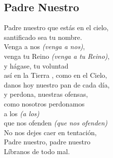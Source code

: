 

\subsection{Padre Nuestro}

\begin{center}

{\Large
Padre nuestro que estás en el cielo,\\   
santificado sea tu nombre.\\
Venga a nos \textit{(venga a nos)}, \\ 
venga tu Reino \textit{(venga a tu Reino)},\\
\vspace{1em}
y  hágase, tu voluntad\\
así en la Tierra , como en el Cielo,\\
danos hoy nuestro pan de cada día,\\
\vspace{1em}
y perdona, nuestras ofensas,\\
como nosotros perdonamos\\
a los \textit{(a los)}\\
que nos ofenden
\textit{(que nos ofenden)}\\   
\vspace{1em}
No nos dejes caer en tentación,\\
Padre nuestro, padre nuestro\\
Líbranos de todo mal.
}

\end{center}
